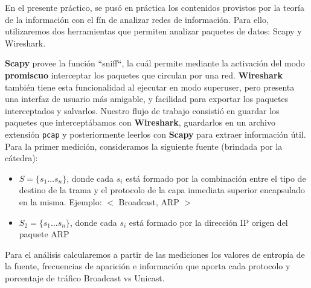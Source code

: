 

En el presente práctico, se pusó en práctica los contenidos provistos por la teoría de la información con el fín de analizar redes de información. Para ello, utilizaremos dos herramientas que permiten analizar paquetes de datos: Scapy y Wireshark.

{\bf Scapy} provee la función ``sniff``, la cuál permite mediante la activación del modo {\bf promiscuo} interceptar los paquetes que circulan por una red. {\bf Wireshark} también tiene esta funcionalidad al ejecutar en modo superuser, pero presenta una interfaz de usuario más amigable, y facilidad para exportar los paquetes interceptados y salvarlos. Nuestro flujo de trabajo consistió en guardar los paquetes que interceptábamos con {\bf Wireshark}, guardarlos en un archivo extensión \texttt{pcap} y posteriormente leerlos con {\bf Scapy} para extraer información útil.
\newline
Para la primer medición, consideramos la siguiente fuente (brindada por la cátedra):
\begin{itemize}

    \item $S = \{s_{1} \dots s_{n}\}$, donde cada $s_{i}$ está formado por la combinación entre el tipo de destino de la trama y el protocolo de la capa inmediata superior encapsulado en la misma. Ejemplo: $<$ Broadcast, ARP $>$
    
        \item $S_{2} = \{s_{1} \dots s_{n}\}$, donde cada $s_{i}$ está formado por la dirección IP origen del paquete ARP
    
\end{itemize}

Para el análisis calcularemos a partir de las mediciones los valores de entropía de la fuente, frecuencias de aparición e información que aporta cada protocolo y porcentaje de tráfico Broadcast vs Unicast.